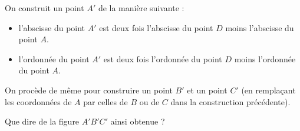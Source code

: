 \documentclass[12 pt]{article}
\theoremstyle{plain}
\newcounter{n}
\numberwithin{n}{section}
\begin{document}
\begin{figure}[H]
\end{figure}
On construit un point $A'$ de la manière suivante : 
\begin{itemize}
\item l'abscisse du point $A'$ est deux fois l'abscisse du point $D$ moins l'abscisse du point $A$. 
\item l'ordonnée du point $A'$ est deux fois l'ordonnée du point $D$ moins l'ordonnée du point $A$. 
\end{itemize}
On procède de même pour construire un point $B'$ et un point $C'$ (en remplaçant les coordonnées de $A$ par celles
de $B$ ou de $C$ dans la construction précédente).

Que dire de la figure $A'B'C'$ ainsi obtenue ?
	
\end{document}
